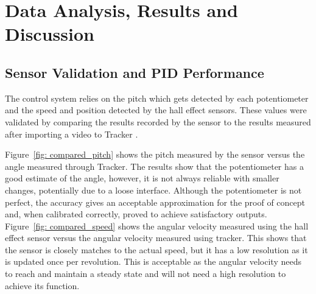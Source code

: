 \chapter{Data Analysis, Results and Discussion}
\label{sec: data_Analysis}
    \section{Sensor Validation and PID Performance}
        The control system relies on the pitch which gets detected by each potentiometer and the speed and position detected by the hall effect sensors. These values were validated by comparing the results recorded by the sensor to the results measured after importing a video to Tracker \citep{Tracker}.
        
        Figure~\ref{fig: compared_pitch} shows the pitch measured by the sensor versus the angle measured through Tracker. The results show that the potentiometer has a good estimate of the angle, however, it is not always reliable with smaller changes, potentially due to a loose interface. Although the potentiometer is not perfect, the accuracy gives an acceptable approximation for the proof of concept and, when calibrated correctly, proved to achieve satisfactory outputs. Figure~\ref{fig: compared_speed} shows the angular velocity measured using the hall effect sensor versus the angular velocity measured using tracker. This shows that the sensor is closely matches to the actual speed, but it has a low resolution as it is updated once per revolution. This is acceptable as the angular velocity needs to reach and maintain a steady state and will not need a high resolution to achieve its function. 

